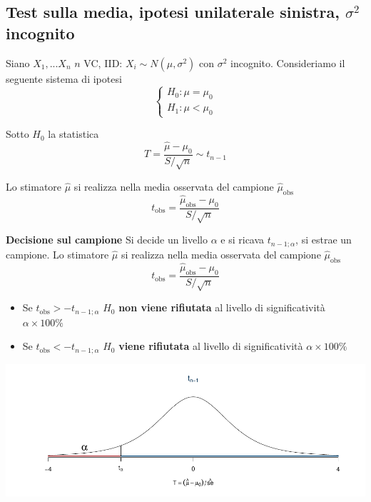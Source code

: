 \documentclass[
  11pt,
]{book}
\providecommand{\tightlist}{%
  \setlength{\itemsep}{0pt}\setlength{\parskip}{0pt}}
\theoremstyle{mytheoremstyle}
\theoremstyle{mydefstyle}
\begin{document}
\subsection{\texorpdfstring{Test sulla media, ipotesi unilaterale sinistra, \(\sigma^2\) incognito}{Test sulla media, ipotesi unilaterale sinistra, \textbackslash sigma\^{}2 incognito}}\label{test-sulla-media-ipotesi-unilaterale-sinistra-sigma2-incognito}

Siano \(X_1,...X_n\) \(n\) VC, IID: \(X_i\sim N(\mu,\sigma^2)\) con \(\sigma^2\)
incognito. Consideriamo il seguente sistema di ipotesi \[\begin{cases}
H_0:\mu=\mu_0\\
H_1:\mu<\mu_0
\end{cases}\]

Sotto \(H_0\) la statistica
\[T=\frac{\hat \mu-\mu_0}{S/\sqrt n}\sim t_{n-1}\]

Lo stimatore \(\hat\mu\) si realizza nella media osservata del campione
\(\hat\mu_\text{obs}\) \[t_{\text{obs}}=\frac{\hat\mu_\text{obs} -\mu_0}{S/\sqrt n}\]

\begin{info}

\textbf{Decisione sul campione} Si decide un livello \(\alpha\) e si ricava
\(t_{n-1;\alpha}\), si estrae un campione. Lo stimatore \(\hat\mu\) si
realizza nella media osservata del campione \(\hat\mu_\text{obs}\)
\[t_{\text{obs}}=\frac{\hat\mu_\text{obs} -\mu_0}{S/\sqrt n}\]

\begin{itemize}
\tightlist
\item
  Se \(t_{\text{obs}}>-t_{n-1;\alpha}\) \(H_0\) \textbf{non viene rifiutata} al
  livello di significatività \(\alpha\times100\%\)
\item
  Se \(t_{\text{obs}}<-t_{n-1;\alpha}\) \(H_0\) \textbf{viene rifiutata} al
  livello di significatività \(\alpha\times100\%\)
\end{itemize}

\end{info}

\begin{center}\includegraphics{Appunti_di_Statistica_2025_files/figure-latex/15-test-mu-pi-23-1} \end{center}
\end{document}
